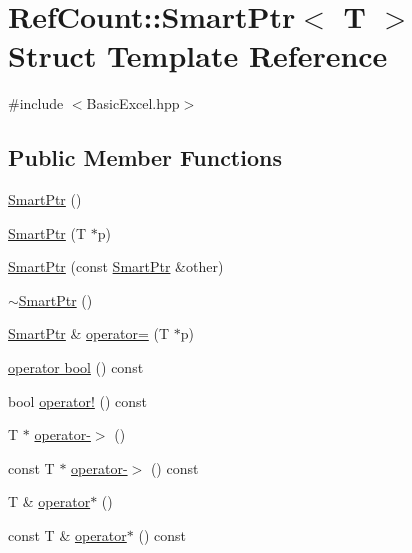 \hypertarget{struct_ref_count_1_1_smart_ptr}{}\section{Ref\+Count\+:\+:Smart\+Ptr$<$ T $>$ Struct Template Reference}
\label{struct_ref_count_1_1_smart_ptr}


{\ttfamily \#include $<$Basic\+Excel.\+hpp$>$}

\subsection*{Public Member Functions}
\begin{DoxyCompactItemize}
\item 
\hyperlink{struct_ref_count_1_1_smart_ptr_ad074429beb571024a3e7163ea23e4549}{Smart\+Ptr} ()
\item 
\hyperlink{struct_ref_count_1_1_smart_ptr_a4dd31622ad633625198ad72b2a516780}{Smart\+Ptr} (T $\ast$p)
\item 
\hyperlink{struct_ref_count_1_1_smart_ptr_a3070abd483a035456d9ca5502fd4b3d8}{Smart\+Ptr} (const \hyperlink{struct_ref_count_1_1_smart_ptr}{Smart\+Ptr} \&other)
\item 
\hyperlink{struct_ref_count_1_1_smart_ptr_a763720e16a21250c943c72d253687ef9}{$\sim$\+Smart\+Ptr} ()
\item 
\hyperlink{struct_ref_count_1_1_smart_ptr}{Smart\+Ptr} \& \hyperlink{struct_ref_count_1_1_smart_ptr_a55b03fe0e11cf6f8ce2288a4c1b26cbe}{operator=} (T $\ast$p)
\item 
\hyperlink{struct_ref_count_1_1_smart_ptr_a2b04ce3de1a459ece3ff1085747b3b31}{operator bool} () const 
\item 
bool \hyperlink{struct_ref_count_1_1_smart_ptr_aee02f41d66900ff20a553ae80f0f2d1e}{operator!} () const 
\item 
T $\ast$ \hyperlink{struct_ref_count_1_1_smart_ptr_a66e847fc6dfbe990e47dbac08215c3be}{operator-\/$>$} ()
\item 
const T $\ast$ \hyperlink{struct_ref_count_1_1_smart_ptr_a4ae9528614812cf1072d96b36a0aad63}{operator-\/$>$} () const 
\item 
T \& \hyperlink{struct_ref_count_1_1_smart_ptr_a29dc9811bba00dbd98d1fe77a0a90adc}{operator$\ast$} ()
\item 
const T \& \hyperlink{struct_ref_count_1_1_smart_ptr_a66c0ada25b37ce1d15b242b421f253a9}{operator$\ast$} () const 
\item 

\end{DoxyCompactItemize}
